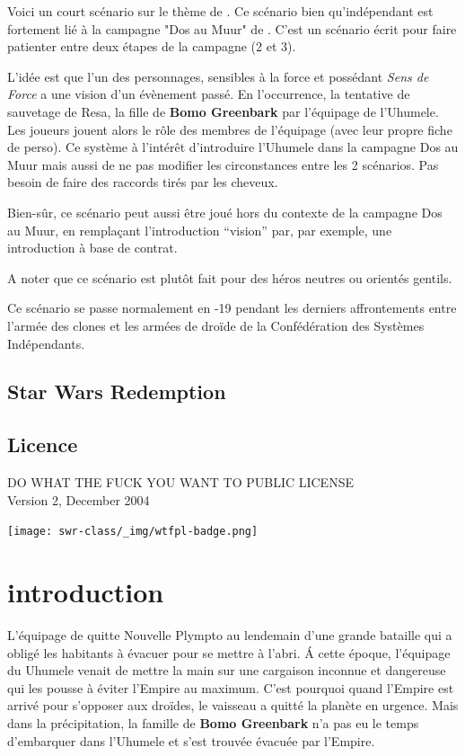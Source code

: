 \documentclass{jdrp}
\begin{document}
	Voici un court scénario sur le thème de . Ce scénario bien qu’indépendant est fortement lié à la campagne "Dos au Muur" de . C’est un scénario écrit pour faire patienter entre deux étapes de la campagne (2 et 3). 

	L’idée est que l’un des personnages, sensibles à la force et possédant \textit{Sens de Force} a une vision d’un évènement passé. En l’occurrence, la tentative de sauvetage de Resa, la fille de \textbf{Bomo Greenbark} par l'équipage de l’Uhumele. Les joueurs jouent alors le rôle des membres de l’équipage (avec leur propre fiche de perso). Ce système à l’intérêt d’introduire l’Uhumele dans la campagne Dos au Muur mais aussi de ne pas modifier les circonstances entre les 2 scénarios. Pas besoin de faire des raccords tirés par les cheveux.

	Bien-sûr, ce scénario peut aussi être joué hors du contexte de la campagne Dos au Muur, en remplaçant l’introduction “vision” par, par exemple, une introduction à base de contrat.

	A noter que ce scénario est plutôt fait pour des héros neutres ou orientés gentils.

	Ce scénario se passe normalement en -19 pendant les derniers affrontements entre l’armée des clones et les armées de droïde de la Confédération des Systèmes Indépendants.

	\subsection{Star Wars Redemption}
	\cite{jdrp-starwars}

	\subsection{Licence}
	\noindent DO WHAT THE FUCK YOU WANT TO PUBLIC LICENSE\\
    Version 2, December 2004
    \vspace{-2.5\baselineskip}
	\begin{flushright}
		\texttt{[image: swr-class/\_img/wtfpl-badge.png]}
	\end{flushright}

	\twocolumn

	\section{introduction}
	L’équipage de  quitte Nouvelle Plympto au lendemain d’une grande bataille qui a obligé les habitants à évacuer pour se mettre à l’abri. \'A cette époque, l’équipage du Uhumele venait de mettre la main sur une cargaison inconnue et dangereuse qui les pousse à éviter l’Empire au maximum. C’est pourquoi quand l’Empire est arrivé pour s’opposer aux droïdes, le vaisseau a quitté la planète en urgence. Mais dans la précipitation, la famille de \textbf{Bomo Greenbark} n’a pas eu le temps d’embarquer dans l’Uhumele et s’est trouvée évacuée par l’Empire.
\end{document}
